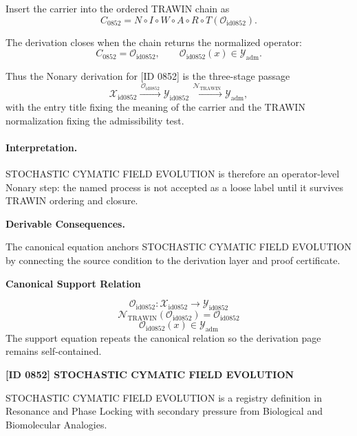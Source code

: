 Insert the carrier into the ordered TRAWIN chain as\[
C_{0852}=N\circ I\circ W\circ A\circ R\circ T(\mathcal{O}_{\mathrm{id0852}}).
\]

The derivation closes when the chain returns the normalized operator:\[
C_{0852}=\mathcal{O}_{\mathrm{id0852}},\qquad \mathcal{O}_{\mathrm{id0852}}(x)\in\mathcal{Y}_{\mathrm{adm}}.
\]

Thus the Nonary derivation for [ID 0852] is the three-stage passage
\[
\mathcal{X}_{\mathrm{id0852}}\xrightarrow{\,\mathcal{O}_{\mathrm{id0852}}\,} \mathcal{Y}_{\mathrm{id0852}}\xrightarrow{\,\mathcal{N}_{\mathrm{TRAWIN}}\,} \mathcal{Y}_{\mathrm{adm}},
\]
with the entry title fixing the meaning of the carrier and the TRAWIN normalization fixing the admissibility test.

\paragraph{Interpretation.} STOCHASTIC CYMATIC FIELD EVOLUTION is therefore an operator-level Nonary step: the named process is not accepted as a loose label until it survives TRAWIN ordering and closure.

\par\vspace{0.35em}
\noindent\textbf{Derivable Consequences.}\quad
\begingroup
\footnotesize
\raggedright
The canonical equation anchors STOCHASTIC CYMATIC FIELD EVOLUTION by connecting the source condition to the derivation layer and proof certificate.
\par\endgroup

\noindent\textbf{Canonical Support Relation}\par
\[
\mathcal{O}_{\mathrm{id0852}}:\mathcal{X}_{\mathrm{id0852}}\longrightarrow\mathcal{Y}_{\mathrm{id0852}}
\]
\[
\mathcal{N}_{\mathrm{TRAWIN}}(\mathcal{O}_{\mathrm{id0852}})=\mathcal{O}_{\mathrm{id0852}}
\]
\[
\mathcal{O}_{\mathrm{id0852}}(x)\in\mathcal{Y}_{\mathrm{adm}}
\]
\noindent The support equation repeats the canonical relation so the derivation page remains self-contained.\par

\clearpage
\noindent\textbf{[ID 0852] STOCHASTIC CYMATIC FIELD EVOLUTION}\par
\vspace{0.35em}
\begingroup\small
{}
STOCHASTIC CYMATIC FIELD EVOLUTION is a registry definition in Resonance and Phase Locking with secondary pressure from Biological and Biomolecular Analogies.

